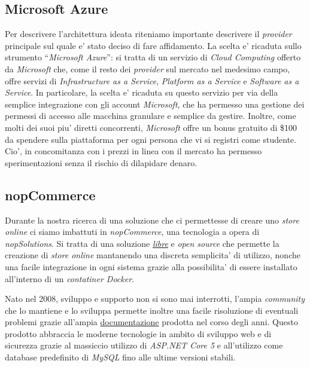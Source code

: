 \documentclass[a4paper]{report}
\newcommand{\quotes}[1]{``#1''}
\begin{document}
		\subsection{Microsoft Azure}\label{microsoft_azure}
			Per descrivere l'architettura ideata riteniamo importante descrivere il \emph{provider} principale sul quale
			e' stato deciso di fare affidamento. La scelta e' ricaduta sullo strumento \quotes{\emph{Microsoft Azure}}:
			si tratta di un servizio di \emph{Cloud Computing} offerto da \emph{Microsoft} che, come il resto dei
			\emph{provider} sul mercato nel medesimo campo, offre servizi di \emph{Infrastructure as a Service},
			\emph{Platform as a Service} e \emph{Software as a Service}.
			In particolare, la scelta e' ricaduta su questo servizio per via della semplice integrazione con gli account
			\emph{Microsoft}, che ha permesso una gestione dei permessi di accesso alle macchina granulare e semplice da
			gestire.
			Inoltre, come molti dei suoi piu' diretti concorrenti, \emph{Microsoft} offre un bonus gratuito di \$100 da
			spendere sulla piattaforma per ogni persona che vi si registri come studente. Cio', in concomitanza con
			i prezzi in linea con il mercato ha permesso sperimentazioni senza il rischio di dilapidare denaro.
		\subsection{nopCommerce}\label{nopcommerce}
			Durante la nostra ricerca di una soluzione che ci permettesse di creare uno \emph{store online} ci siamo
			imbattuti in \emph{nopCommerce}, una tecnologia a opera di \emph{nopSolutions}. Si tratta di una soluzione
			\href{https://github.com/nopSolutions/nopCommerce/blob/develop/LICENSE.md}{\emph{libre}} e
			\emph{open source} che permette la creazione di \emph{store online} mantanendo una discreta
			semplicita' di utilizzo, nonche una facile integrazione in ogni sistema grazie alla possibilita' di essere
			installato all'interno di un \emph{contatiner Docker}.

			Nato nel 2008, sviluppo e supporto non si sono mai interrotti, l'ampia \emph{community} che lo mantiene
			e lo sviluppa permette inoltre una facile risoluzione di eventuali problemi grazie all'ampia
			\href{https://docs.nopcommerce.com/en/developer/index.html?utm\_source=github&utm\_medium=referral&utm\_campaign=documentation&utm\_content=text}{documentazione}
			prodotta nel corso degli anni. Questo prodotto abbraccia le moderne tecnologie in ambito di sviluppo web e
			di sicurezza grazie al massiccio utilizzo di \emph{ASP.NET Core 5} e all'utilizzo come database predefinito
			di \emph{MySQL} fino alle ultime versioni stabili. 
\end{document}

